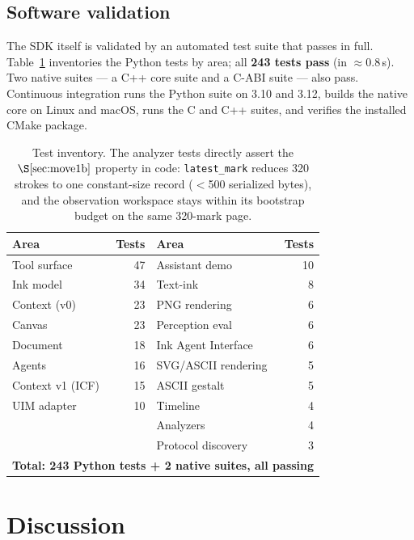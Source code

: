 \documentclass[11pt]{article}
\newcommand{\code}[1]{\texttt{#1}}
\begin{document}
\subsection{Software validation}
\label{sec:software}

The SDK itself is validated by an automated test suite that passes in full.
Table~\ref{tab:tests} inventories the Python tests by area; all
\textbf{243 tests pass} (in $\approx$0.8\,s). Two native suites --- a C++ core
suite and a C-ABI suite --- also pass. Continuous integration runs the Python
suite on 3.10 and 3.12, builds the native core on Linux and macOS, runs the C and
C++ suites, and verifies the installed CMake package.

\begin{table}[t]
\centering
\small
\begin{tabular}{@{}l r l r@{}}
\toprule
\textbf{Area} & \textbf{Tests} & \textbf{Area} & \textbf{Tests} \\
\midrule
Tool surface        & 47 & Assistant demo        & 10 \\
Ink model           & 34 & Text-ink              & 8  \\
Context (v0)        & 23 & PNG rendering         & 6  \\
Canvas              & 23 & Perception eval       & 6  \\
Document            & 18 & Ink Agent Interface   & 6  \\
Agents              & 16 & SVG/ASCII rendering   & 5  \\
Context v1 (ICF)    & 15 & ASCII gestalt         & 5  \\
UIM adapter         & 10 & Timeline              & 4  \\
                    &    & Analyzers             & 4  \\
                    &    & Protocol discovery    & 3  \\
\midrule
\multicolumn{4}{r}{\textbf{Total: 243 Python tests + 2 native suites, all passing}} \\
\bottomrule
\end{tabular}
\caption{Test inventory. The analyzer tests directly assert the
$\S\ref{sec:move1b}$ property in code: \code{latest\_mark} reduces 320 strokes to
one constant-size record ($<$500 serialized bytes), and the observation
workspace stays within its bootstrap budget on the same 320-mark page.}
\label{tab:tests}
\end{table}

\section{Discussion}
\label{sec:discussion}
\end{document}
